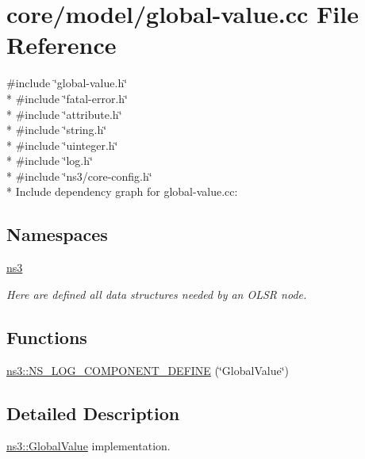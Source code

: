 \hypertarget{global-value_8cc}{}\section{core/model/global-\/value.cc File Reference}
\label{global-value_8cc}
{\ttfamily \#include \char`\"{}global-\/value.\+h\char`\"{}}\\*
{\ttfamily \#include \char`\"{}fatal-\/error.\+h\char`\"{}}\\*
{\ttfamily \#include \char`\"{}attribute.\+h\char`\"{}}\\*
{\ttfamily \#include \char`\"{}string.\+h\char`\"{}}\\*
{\ttfamily \#include \char`\"{}uinteger.\+h\char`\"{}}\\*
{\ttfamily \#include \char`\"{}log.\+h\char`\"{}}\\*
{\ttfamily \#include \char`\"{}ns3/core-\/config.\+h\char`\"{}}\\*
Include dependency graph for global-\/value.cc\+:
\subsection*{Namespaces}
\begin{DoxyCompactItemize}
\item 
 \hyperlink{namespacens3}{ns3}
\begin{DoxyCompactList}\small\item\em Here are defined all data structures needed by an O\+L\+SR node. \end{DoxyCompactList}\end{DoxyCompactItemize}
\subsection*{Functions}
\begin{DoxyCompactItemize}
\item 
\hyperlink{namespacens3_a381b71809049dc339c906970862fc086}{ns3\+::\+N\+S\+\_\+\+L\+O\+G\+\_\+\+C\+O\+M\+P\+O\+N\+E\+N\+T\+\_\+\+D\+E\+F\+I\+NE} (\char`\"{}Global\+Value\char`\"{})
\end{DoxyCompactItemize}


\subsection{Detailed Description}
\hyperlink{classns3_1_1GlobalValue}{ns3\+::\+Global\+Value} implementation. 